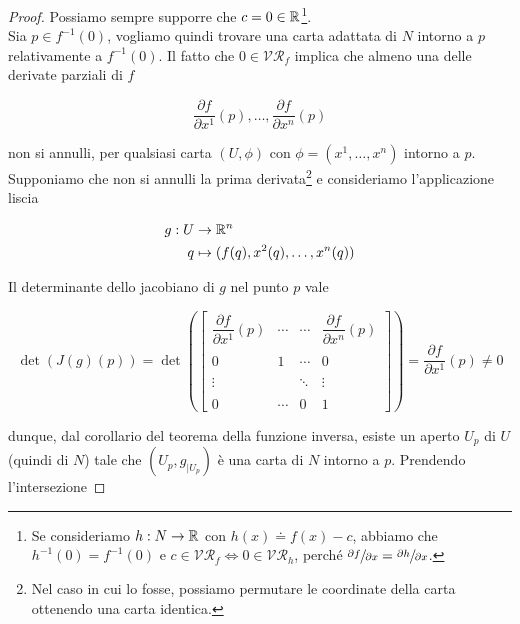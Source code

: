 \begin{proof}
	Possiamo sempre supporre che $ c = 0 \in \mathbb{R} $\footnote{%
		Se consideriamo $ h : N \to \mathbb{R} $ con $ h(x) \doteq f(x) - c $, abbiamo che $ h^{-1}(0) = f^{-1}(0) $ e $ c \in \mathcal{VR}_{f} \iff 0 \in \mathcal{VR}_{h} $, perché $ \sfrac{\partial f}{\partial x} = \sfrac{\partial h}{\partial x} $.%
	}.\\
	Sia $ p \in f^{-1}(0) $, vogliamo quindi trovare una carta adattata di $ N $ intorno a $ p $ relativamente a $ f^{-1}(0) $. Il fatto che $ 0 \in \mathcal{VR}_{f} $ implica che almeno una delle derivate parziali di $ f $
	
	\begin{equation}
		\dfrac{\partial f}{\partial x^{1}} (p), \dots, \dfrac{\partial f}{\partial x^{n}} (p)
	\end{equation}
	
	non si annulli, per qualsiasi carta $ (U,\phi) $ con $ \phi = (x^{1},\dots,x^{n}) $ intorno a $ p $.\\
	Supponiamo che non si annulli la prima derivata\footnote{%
		Nel caso in cui lo fosse, possiamo permutare le coordinate della carta ottenendo una carta identica.%
	} e consideriamo l'applicazione liscia

	\begin{align}
		\begin{split}
			g : U &\to \mathbb{R}^{n}\\
			q &\mapsto (f(q),x^{2}(q),\dots,x^{n}(q))
		\end{split}
	\end{align}

	Il determinante dello jacobiano di $ g $ nel punto $ p $ vale
	
	\begin{equation}
		\det(J(g)(p)) = \det ( \begin{bmatrix} \dfrac{\partial f}{\partial x^{1}} (p) & \cdots & \cdots & \dfrac{\partial f}{\partial x^{n}} (p) \\\\ 0 & 1 & \cdots & 0 \\\\ \vdots & & \ddots & \vdots \\\\ 0 & \cdots & 0 & 1 \end{bmatrix} ) = \dfrac{\partial f}{\partial x^{1}} (p) \neq 0
	\end{equation}

	dunque, dal corollario del teorema della funzione inversa, esiste un aperto $ U_{p} $ di $ U $ (quindi di $ N $) tale che $ (U_{p},g_{|U_{p}}) $ è una carta di $ N $ intorno a $ p $. Prendendo l'intersezione
	

\end{proof}
